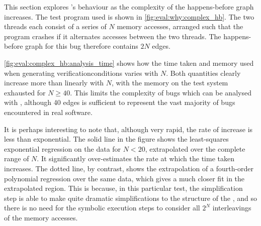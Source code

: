 This section explores {\technique}'s behaviour as the complexity of
the happens-before graph increases.  The test program used is shown in
\autoref{fig:eval:why:complex_hb}.  The two threads each consist of a
series of $N$ memory accesses, arranged such that the program crashes
if it alternates accesses between the two threads.  The happens-before
graph for this bug therefore contains $2N$ edges.


\autoref{fig:eval:complex_hb:analysis_time} shows how the time taken
and memory used when generating \glspl{verificationcondition} varies
with $N$.  Both quantities clearly increase more than linearly with
$N$, with the memory on the test system exhausted for $N \geq 40$.
This limits the complexity of bugs which can be analysed with
{\technique}, although 40 edges is sufficient to represent the vast
majority of bugs encountered in real software\needCite{}.

 It is perhaps interesting to
note that, although very rapid, the rate of increase is less than
exponential.  The solid line in the figure shows the least-squares
exponential regression on the data for $N<20$, extrapolated over the
complete range of $N$.  It significantly over-estimates the rate at
which the time taken increases.  The dotted line, by contrast, shows
the extrapolation of a fourth-order polynomial regression over the
same data, which gives a much closer fit in the extrapolated region.
This is because, in this particular test, the {\StateMachine}
simplification step is able to make quite dramatic simplifications to
the structure of the {\StateMachines}, and so there is no need for the
symbolic execution steps to consider all $2^N$ interleavings of the
memory accesses.

